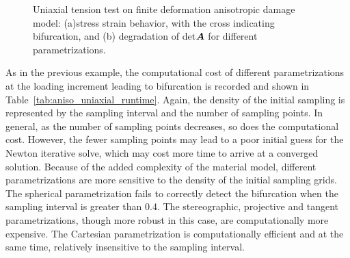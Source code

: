 \documentclass[12pt]{article}
\numberwithin{equation}{section}
\begin{document}
\begin{figure}[H]
  \centering {} 
  \caption{Uniaxial tension test on finite deformation 
  anisotropic damage model: 
  (a)stress strain behavior, with the cross indicating bifurcation, and
  (b) degradation of det${\boldsymbol{A}}$ for different
  parametrizations.}
  \label{fig:aniso_stress_stretch}
\end{figure}

As in the previous example, the computational cost of different 
parametrizations at the loading increment leading to bifurcation is 
recorded and shown in Table~\ref{tab:aniso_uniaxial_runtime}. Again, 
the density of the initial sampling is represented by the sampling 
interval and the number of sampling points. In general, as the number 
of sampling points decreases, so does the computational cost. However, 
the fewer sampling points may lead to a poor initial guess for the 
Newton iterative solve, which may cost more time to arrive at a 
converged solution. Because of the added complexity of the material 
model, different parametrizations are more sensitive to the density of 
the initial sampling grids. The spherical parametrization fails to 
correctly detect the bifurcation when the sampling interval is greater 
than 0.4. The stereographic, projective and tangent parametrizations, 
though more robust in this case, are computationally more expensive. 
The Cartesian parametrization is computationally efficient and at the 
same time, relatively insensitive to the sampling interval. 
\end{document}
